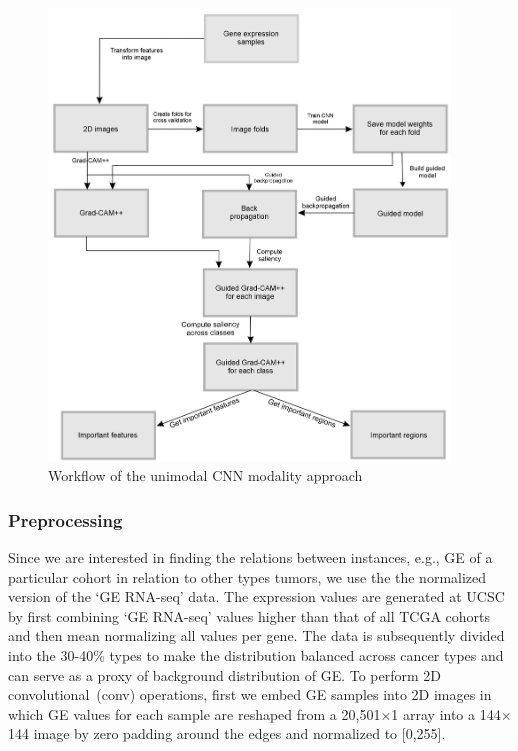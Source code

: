 \begin{figure}[h]
	\centering
	\includegraphics[width=\textwidth,height=120mm]{images/wf_2D_CNN.png}
    \caption{Workflow of the unimodal CNN modality approach}	
	\label{fig:workflow_2D_CNN}
\end{figure}

\subsubsection{Preprocessing}
Since we are interested in finding the relations between instances, e.g., GE of a particular cohort in relation to other types tumors, we use the the normalized version of the `GE RNA-seq' data. The expression values are generated at UCSC by first combining `GE RNA-seq' values higher than that of all TCGA cohorts and then mean normalizing all values per gene. The data is subsequently divided into the 30-40\% types to make the distribution balanced across cancer types and can serve as a proxy of background distribution of GE. To perform 2D  convolutional~(conv) operations, first we embed GE samples into 2D images in which GE values for each sample are reshaped from a 20,501$\times$1 array into a 144$\times$144 image by zero padding around the edges and normalized to [0,255].%

